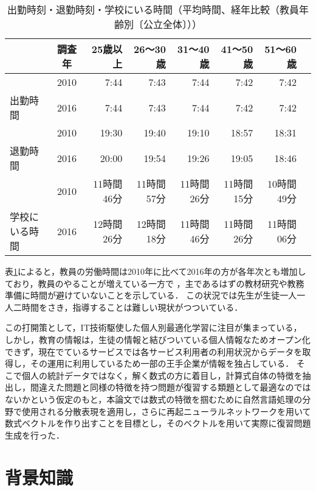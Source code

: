 \documentclass[a4j,11pt,report]{jsbook}
\begin{document}
\begin{center}
  \begin{table}
    \begin{tabular}{|l|c|r|r|r|r|r|r|} \hline
      & 調査年 & 25歳以上 & 26〜30歳 & 31〜40歳 & 41〜50歳 & 51〜60歳  \\ \hline \hline
      & 2010 & 7:44 & 7:43 & 7:44 & 7:42 & 7:42 \\ \cline{2-7}
      出勤時間 & 2016 & 7:44 & 7:43 & 7:44 & 7:42 & 7:42 \\ \cline{2-7}\hline
      & 2010 & 19:30 & 19:40 & 19:10 & 18:57 & 18:31 \\ \cline{2-7}
      退勤時間 & 2016 & 20:00 & 19:54 & 19:26 & 19:05 & 18:46 \\ \cline{2-7}\hline
      & 2010 & 11時間46分 & 11時間57分 & 11時間26分 & 11時間15分 & 10時間49分  \\ \cline{2-7}
      学校にいる時間  & 2016 & 12時間26分 & 12時間18分 & 11時間46分 & 11時間26分 & 11時間06分 \\ \cline{2-7}\hline
    \end{tabular}

    \caption{出勤時刻・退勤時刻・学校にいる時間（平均時間、経年比較（教員年齢別〔公立全体〕））}
    \label{tb:teacher_time}
  \end{table}
\end{center}

表\ref{tb:teacher_time}によると，教員の労働時間は2010年に比べて2016年の方が各年次とも増加しており，教員のやることが増えている一方で
，主であるはずの教材研究や教務準備に時間が避けていないことを示している．
この状況では先生が生徒一人一人二時間をさき，指導することは難しい現状がつついている．

この打開策として，IT技術駆使した個人別最適化学習に注目が集まっている，
しかし，教育の情報は，生徒の情報と結びついている個人情報なためオープン化できず，現在でているサービスでは各サービス利用者の利用状況からデータを取得し，その運用に利用しているため一部の王手企業が情報を独占している．
そこで個人の統計データではなく，解く数式の方に着目し，計算式自体の特徴を抽出し，間違えた問題と同様の特徴を持つ問題が復習する類題として最適なのではないかという仮定のもと，本論文では数式の特徴を掴むために自然言語処理の分野で使用される分散表現を適用し，さらに再起ニューラルネットワークを用いて数式ベクトルを作り出すことを目標とし，そのベクトルを用いて実際に復習問題生成を行った．


\chapter{背景知識\label{ch:background}}
\end{document}
